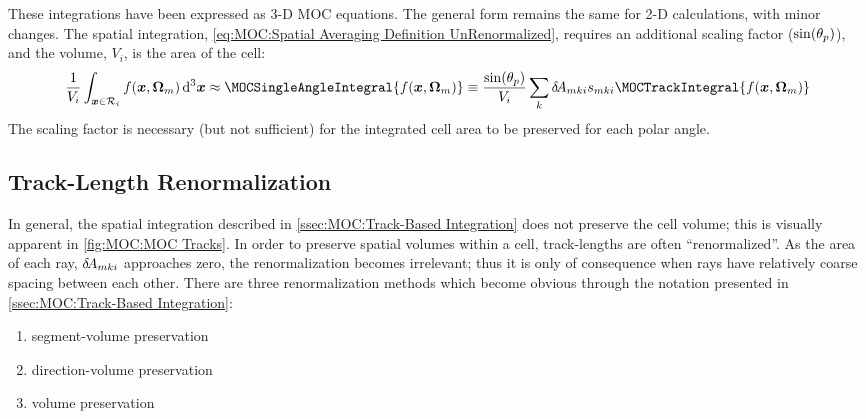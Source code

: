 {{{            These integrations have been expressed as 3-D \ac{MOC} equations.
            The general form remains the same for 2-D calculations, with minor changes.
            The spatial integration, \cref{eq:MOC:Spatial Averaging Definition UnRenormalized}, requires an additional scaling factor ($\sin(\theta_p)$), and the volume, $V_i$, is the area of the cell:
            \begin{equation}
              \label{eq:MOC:Spatial Averaging Definition UnRenormalized 2D}
              \frac{1}{V_i}\intl[\loc\in\Region]f(\loc,\dirm)\dif^3{\loc} \approx \MOCSingleAngleIntegral{f(\loc,\dirm)} \defined \frac{\sin(\Polar_p)}{V_i}\suml[k]\tA[mki]\segl\MOCTrackIntegral{f(\loc,\dirm)}
            \end{equation}
            The scaling factor is necessary (but not sufficient) for the integrated cell area to be preserved for each polar angle.
        }
        \subsection{Track-Length Renormalization}{\label{sec:MOC:Track-Length Renormalization}
            In general, the spatial integration described in \cref{ssec:MOC:Track-Based Integration} does not preserve the cell volume; this is visually apparent in \cref{fig:MOC:MOC Tracks}.
            In order to preserve spatial volumes within a cell, track-lengths are often ``renormalized''.
            As the area of each ray, $\tA[mki]$ approaches zero, the renormalization becomes irrelevant; thus it is only of consequence when rays have relatively coarse spacing between each other.
            There are three renormalization methods which become obvious through the notation presented in \cref{ssec:MOC:Track-Based Integration}:
            \begin{enumerate}
                \item{segment-volume preservation}
                \item{direction-volume preservation}
                \item{volume preservation}
            \end{enumerate}

}}}
